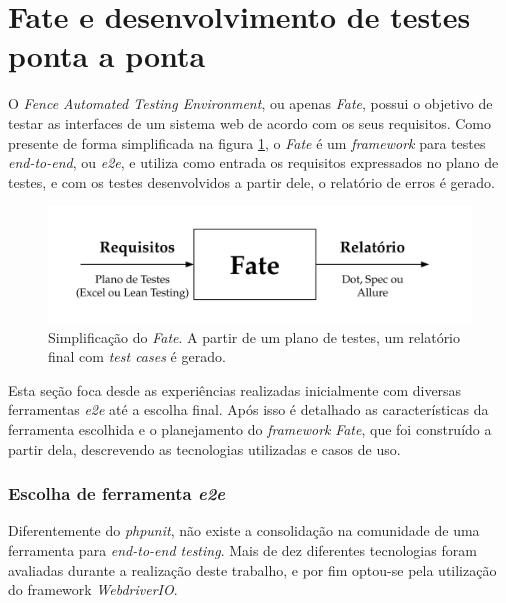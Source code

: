 \hypertarget{fence-automated-testing-environment}{%
\section{Fate e desenvolvimento de testes ponta a ponta}\label{fence-automated-testing-environment}}

O \emph{Fence Automated Testing Environment}, ou apenas \emph{Fate}, possui o objetivo de testar as interfaces de um sistema web de acordo com os seus requisitos. Como presente de forma simplificada na figura \ref{fig:fate-esq}, o \emph{Fate} é um \emph{framework} para testes \emph{end-to-end}, ou \emph{e2e}, e utiliza como entrada os requisitos expressados no plano de testes, e com os testes desenvolvidos a partir dele, o relatório de erros é gerado.

\begin{figure}[H]
    \centering
    \includegraphics[width=13cm]{source/4-solucao/images/fate-esq.png}
    \caption{Simplificação do \emph{Fate}. A partir de um plano de testes, um relatório final com \emph{test cases} é gerado.}
    \label{fig:fate-esq}
\end{figure}

Esta seção foca desde as experiências realizadas inicialmente com diversas ferramentas \emph{e2e} até a escolha final. Após isso é detalhado as características da ferramenta escolhida e o planejamento do \emph{framework} \emph{Fate}, que foi construído a partir dela, descrevendo as tecnologias utilizadas e casos de uso.

\hypertarget{escolha-de-ferramenta-e2e}{%
\subsubsection{\texorpdfstring{Escolha de ferramenta \emph{e2e}}{Escolha de ferramenta e2e}}\label{escolha-de-ferramenta-e2e}}

Diferentemente do \emph{phpunit}, não existe a consolidação na comunidade de uma ferramenta para \emph{end-to-end testing}. Mais de dez diferentes tecnologias foram avaliadas durante a realização deste trabalho, e por fim optou-se pela utilização do framework \emph{WebdriverIO}.

